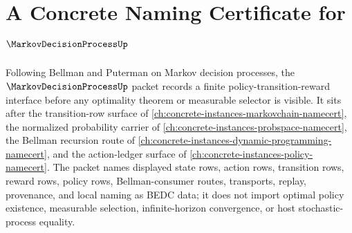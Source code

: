 \chapter{A Concrete Naming Certificate for $\MarkovDecisionProcessUp$}
\label{ch:concrete-instances-markov-decision-process-namecert}

Following Bellman and Puterman on Markov decision processes, the $\MarkovDecisionProcessUp$ packet records a finite policy-transition-reward interface before any optimality theorem or measurable selector is visible. It sits after the transition-row surface of \autoref{ch:concrete-instances-markovchain-namecert}, the normalized probability carrier of \autoref{ch:concrete-instances-probspace-namecert}, the Bellman recursion route of \autoref{ch:concrete-instances-dynamic-programming-namecert}, and the action-ledger surface of \autoref{ch:concrete-instances-policy-namecert}. The packet names displayed state rows, action rows, transition rows, reward rows, policy rows, Bellman-consumer routes, transports, replay, provenance, and local naming as BEDC data; it does not import optimal policy existence, measurable selection, infinite-horizon convergence, or host stochastic-process equality.

